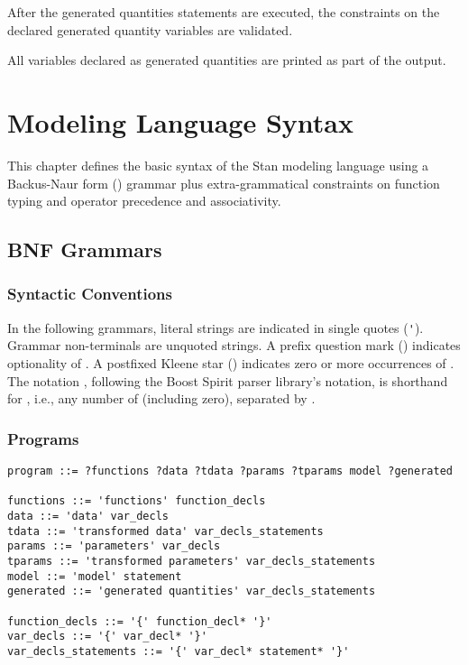After the generated quantities statements are executed, the constraints
on the declared generated quantity variables are validated.

All variables declared as generated quantities are printed as part of
the output. 

\chapter{Modeling Language Syntax}

\noindent
This chapter defines the basic syntax of the Stan modeling language
using a Backus-Naur form (\BNF) grammar plus extra-grammatical
constraints on function typing and operator precedence and
associativity.


\section{BNF Grammars}

\subsection{Syntactic Conventions}

In the following \BNF grammars, literal strings are indicated in
single quotes (\Verb|'|).  Grammar non-terminals are unquoted strings.
A prefix question mark () indicates optionality of .
A postfixed Kleene star () indicates zero or more occurrences
of .  The notation , following the Boost Spirit
parser library's notation, is shorthand for , i.e.,
any number of  (including zero), separated by .

\subsection{Programs}

{\small
\begin{Verbatim}[fontsize=\small]
program ::= ?functions ?data ?tdata ?params ?tparams model ?generated

functions ::= 'functions' function_decls
data ::= 'data' var_decls
tdata ::= 'transformed data' var_decls_statements
params ::= 'parameters' var_decls
tparams ::= 'transformed parameters' var_decls_statements
model ::= 'model' statement
generated ::= 'generated quantities' var_decls_statements

function_decls ::= '{' function_decl* '}'
var_decls ::= '{' var_decl* '}'
var_decls_statements ::= '{' var_decl* statement* '}'
\end{Verbatim}
}

